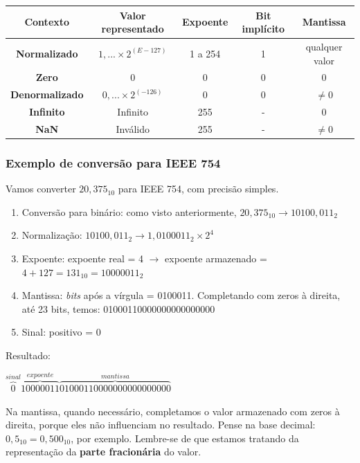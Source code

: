 \documentclass[12pt]{article}
\begin{document}
\begin{center}
\begin{tabular}{|c|c|c|c|c|}
\hline
\textbf{Contexto} & \textbf{Valor representado} & \textbf{Expoente} & \textbf{Bit implícito} & \textbf{Mantissa} \\
\hline
\textbf{Normalizado} & $1,... \times 2^{(E-127)}$ & 1 a 254 & 1 & qualquer valor \\
\hline
\textbf{Zero} & 0 & 0 & 0 & 0 \\
\hline
\textbf{Denormalizado} & $0,... \times 2^{(-126)}$ & 0 & 0 & $\neq 0$ \\
\hline
\textbf{Infinito} & Infinito & 255 & - & 0 \\
\hline
\textbf{NaN} & Inválido & 255 & - & $\neq 0$ \\
\hline
\end{tabular}
\end{center}

\subsubsection{Exemplo de conversão para IEEE 754}
Vamos converter $20,375_{10}$ para IEEE 754, com precisão simples.

\begin{enumerate}
    \item Conversão para binário: como visto anteriormente, $20,375_{10} \rightarrow{} 10100,011_{2}$ 
    \item Normalização: $10100,011_{2} \rightarrow{} 1,0100011_{2} \times 2^{4}$ 
    \item Expoente: expoente real = 4 $\rightarrow{}$ expoente armazenado = $4 + 127 = 131_{10} = 10000011_{2}$ 
    \item Mantissa: \textit{bits} após a vírgula = 0100011. Completando com zeros à direita, até 23 bits, temos: 01000110000000000000000
    \item Sinal: positivo = 0
\end{enumerate}

\vspace{0.2cm}
\noindent
Resultado: 

\begin{center}
$\overset{sinal}{\overbrace{0}}\overset{expoente}{\overbrace{10000011}}\overset{mantissa}{\overbrace{01000110000000000000000}}$ 
\end{center}

\begin{tcolorbox}[mynote, title= Observação]
Na mantissa, quando necessário, completamos o valor armazenado com zeros à direita, porque eles não influenciam no resultado. Pense na base decimal: $0,5_{10} = 0,500_{10}$, por exemplo. Lembre-se de que estamos tratando da representação da \textbf{parte fracionária} do valor.
\end{tcolorbox}
\end{document}
